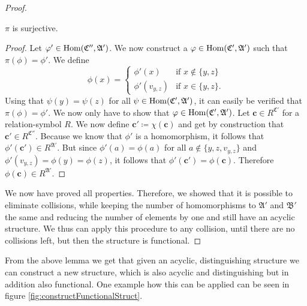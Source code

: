 \begin{proof}
	\begin{claim}
		$\pi$ is surjective.
	\end{claim}
	\begin{proof}
		Let $\varphi'\in\operatorname{Hom}(\mathfrak C'',\mathfrak A')$.
		We now construct a $\varphi\in\operatorname{Hom}(\mathfrak C',\mathfrak A')$ such that $\pi(\phi)=\phi'$.
		We define
		$$
		\phi(x)=
		\begin{cases}
			\phi'(x) & \text{if } x \notin \{y,z\} \\
			\phi'(v_{y,z}) & \text{if } x \in \{y,z\}.
		\end{cases}
		$$
		Using that $\psi(y)=\psi(z)$ for all $\psi\in\operatorname{Hom}(\mathfrak C',\mathfrak A')$, it can easily be verified that $\pi(\phi)=\phi'$.
		We now only have to show that $\varphi\in\operatorname{Hom}(\mathfrak C',\mathfrak A')$. 
		Let $\mathbf c\in R^{\mathfrak C'}$ for a relation-symbol $R$.
		We now define $\mathbf c'\coloneqq \chi(\mathbf c)$ and get by construction that $\mathbf c'\in R^{\mathfrak C''}$.
		Because we know that $\phi'$ is a homomorphism, it follows that $\phi'(\mathbf c')\in R^{\mathfrak A'}$.
		But since $\phi'(a)=\phi(a)$ for all $a\notin \{y,z,v_{y,z}\}$ and $\phi'(v_{y,z})=\phi(y)=\phi(z)$, it follows that $\phi'(\mathbf c')=\phi(\mathbf c)$.
		Therefore $\phi(\mathbf c)\in R^{\mathfrak A'}$.
	\end{proof}
	
	We now have proved all properties.
	Therefore, we showed that it is possible to eliminate collisions, while keeping the number of homomorphisms to $\mathfrak A'$ and $\mathfrak B'$ the same and reducing the number of elements by one and still have an acyclic structure.
	We thus can apply this procedure to any collision, until there are no collisions left, but then the structure is functional.
\end{proof}

From the above lemma we get that given an acyclic, distinguishing structure we can construct a new structure, which is also acyclic and distinguishing but in addition also functional.
One example how this can be applied can be seen in figure \ref{fig:constructFunctionalStruct}.

